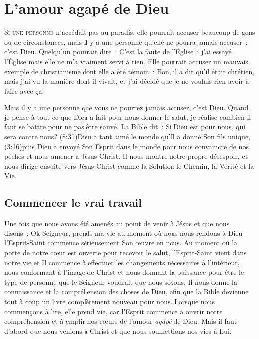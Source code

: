 \chapter{L'amour agap\'e de Dieu}

\begin{specialpar}{}
\lettrine{S}{i une personne} n'accédait pas au paradis,
 elle pourrait accuser beaucoup de gens
 ou de circonstances, mais il y a une personne
 qu'elle ne pourra jamais accuser~: c'est Dieu.
 Quelqu'un pourrait dire~:
 \og C'est la faute de l'Église~: j'ai essayé l'Église mais
 elle ne m'a vraiment servi à rien. \fg{}
 Elle pourrait accuser un mauvais exemple de christianisme
 dont elle a été témoin~:
 \og Bon, il a dit qu'il était chrétien, mais j'ai vu la manière
 dont il vivait, et j'ai décidé que je ne voulais rien avoir à faire
 avec ça. \fg{}
\end{specialpar}

Mais il y a une personne que vous ne pourrez jamais accuser, c'est Dieu.
 Quand je pense à tout ce que Dieu a fait pour nous donner le salut,
 je réalise combien il faut se battre pour ne pas être sauvé.
 La Bible dit~:
 \og Si Dieu est pour nous, qui sera contre nous? \fg{}
 (8:31)Dieu a tant aimé le monde qu'Il a donné
 Son fils unique, (3:16)puis Dieu a envoyé Son Esprit
 dans le monde pour nous convaincre
 de nos péchés et nous amener à Jésus-Christ.
 Il nous montre notre propre désespoir, et nous dirige ensuite
 vers Jésus-Christ comme la Solution \ocadr le Chemin, la Vérité et la Vie.

\section*{Commencer le vrai travail}

\begin{specialpar}{}
Une fois que nous avons été amenés au point de venir à Jésus
 et que nous disons~:
 \og Ok Seigneur, prends ma vie \fg{}
 \ocadr au moment où nous nous rendons à Dieu \fcadr
 l'Esprit-Saint commence sérieusement Son œuvre en nous.
 Au moment où la porte de notre cœur est ouverte pour recevoir le salut,
 l'Esprit-Saint vient dans notre vie et Il commence à effectuer
 les changements nécessaires à l'intérieur, nous conformant
 à l'image de Christ et nous donnant la puissance pour être
 le type de personne que le Seigneur voudrait que nous soyons.
 Il nous donne la connaissance et la compréhension des choses de Dieu,
 afin que la Bible devienne tout à coup un livre complètement
 nouveau pour nous. Lorsque nous commençons à lire,
 elle prend vie, car l'Esprit commence à ouvrir notre compréhension
 et à emplir nos cœurs de l'amour \emph{agapé} de Dieu.
 Mais il faut d'abord que nous venions à Christ
 et que nous soumettions nos vies à Lui.
\end{specialpar}

